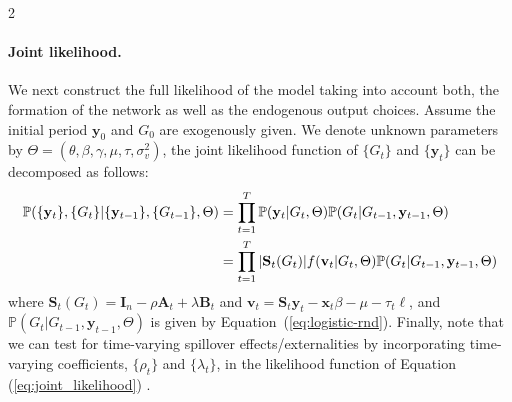 \documentclass[12pt]{article}
\begin{document}
\begin{spacing}{2}
\paragraph{Joint likelihood.} We next construct the full likelihood of the model taking into account both, the formation of the network as well as the endogenous output choices. Assume the initial period $\mathbf{y}_0$ and $G_0$ are exogenously given. We denote unknown parameters by $\Theta=(\theta,\beta,\gamma,\mu,\tau,\sigma^2_v)$, the joint likelihood function of $\{G_t\}$ and $\{\mathbf{y}_t\}$ can be decomposed as follows:
\begin{align}
\mathbb{P}(\{\mathbf{y}_t\}, \{G_t\}|\{\mathbf{y}_{t-1}\}, \{G_{t-1}\},\Theta)
&=
\prod_{t=1}^T
\mathbb{P}(\mathbf{y}_t | G_{t},\Theta)
\mathbb{P}(G_t | G_{t-1}, \mathbf{y}_{t-1},\Theta) \notag \\
&= 
\prod_{t=1}^T
|\mathbf{S}_t(G_t)|f(\mathbf{v}_t|G_t,\Theta)
\mathbb{P}(G_t | G_{t-1}, \mathbf{y}_{t-1},\Theta) \notag \\
\label{eq:joint_likelihood} 
\end{align}
where $\mathbf{S}_t(G_t)= \mathbf{I}_n  - \rho \mathbf{A}_t + \lambda \mathbf{B}_{t}$ and $\mathbf{v}_t=
\mathbf{S}_t\mathbf{y}_t- \mathbf{x}_{t} \beta - \mu - \tau_t \ell$, and 
$\mathbb{P}(G_t | G_{t-1},\mathbf{y}_{t-1},\Theta)$ is given   
by Equation~(\ref{eq:logistic-rnd}).
Finally, note that we can test for time-varying spillover effects/externalities by incorporating time-varying coefficients, $\{\rho_t\}$ and $\{\lambda_t\}$, in the likelihood function of Equation (\ref{eq:joint_likelihood}) \citep[cf.][]{Gulati2010,Lucking2019}. 


\end{spacing}
\end{document}
